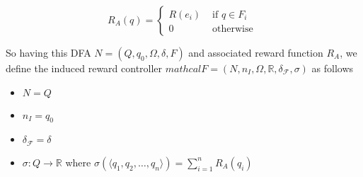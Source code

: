 \begin{equation*}
R_A(q) = \begin{cases}
R(e_i) & \text{ if } q\in F_i \\
0 & \text{ otherwise }
\end{cases}
\end{equation*}



\begin{definition}
So having this DFA $N=(Q,q_0,\Omega,\delta,F)$ and associated reward function $R_A$, we define the induced reward controller $mathcal{F}=(N,n_I,\Omega, \mathbb{R}, \delta_\mathcal{F},\sigma)$ as follows
\begin{itemize}
\item $N=Q$
\item $n_I=q_0$
\item $\delta_\mathcal{F}=\delta$
\item $\sigma: Q\to\mathbb{R}$ where $\sigma(\langle q_1,q_2,\dots, q_n\rangle) = \sum\limits _{i=1}^n R_A(q_i)$
\end{itemize}
\end{definition}

